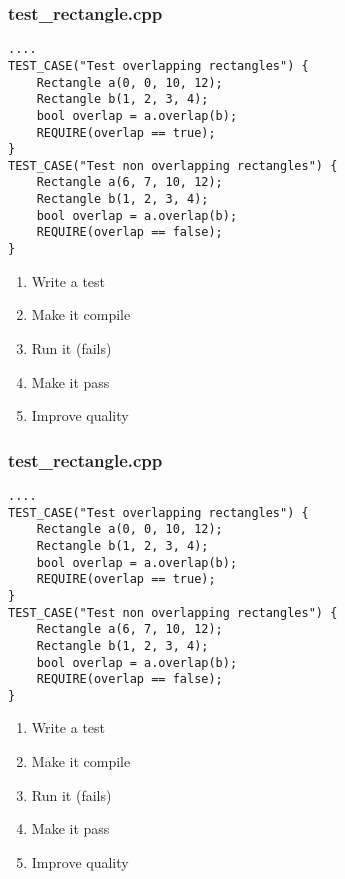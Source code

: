 \begin{frame}[fragile]
\frametitle{test\_rectangle.cpp}
\begin{minipage}[t]{0.48\linewidth}
\begin{lstlisting}
....
TEST_CASE("Test overlapping rectangles") {
    Rectangle a(0, 0, 10, 12);
    Rectangle b(1, 2, 3, 4);
    bool overlap = a.overlap(b);
    REQUIRE(overlap == true);
}
TEST_CASE("Test non overlapping rectangles") {
    Rectangle a(6, 7, 10, 12);
    Rectangle b(1, 2, 3, 4);
    bool overlap = a.overlap(b);
    REQUIRE(overlap == false);
}
\end{lstlisting}
\end{minipage}\hfill
\begin{minipage}[t]{0.28\linewidth}
  \small
  \begin{enumerate} 
    \item \textcolor{activecolor}{Write a test}
    \item \textcolor{deadcolor}{Make it compile}
    \item \textcolor{deadcolor}{Run it (fails)}
    \item \textcolor{deadcolor}{Make it pass}
    \item \textcolor{deadcolor}{Improve quality}
  \end{enumerate} 
\end{minipage}
\end{frame}


\begin{frame}[fragile]
\frametitle{test\_rectangle.cpp}
\begin{minipage}[t]{0.48\linewidth}
\begin{lstlisting}
....
TEST_CASE("Test overlapping rectangles") {
    Rectangle a(0, 0, 10, 12);
    Rectangle b(1, 2, 3, 4);
    bool overlap = a.overlap(b);
    REQUIRE(overlap == true);
}
TEST_CASE("Test non overlapping rectangles") {
    Rectangle a(6, 7, 10, 12);
    Rectangle b(1, 2, 3, 4);
    bool overlap = a.overlap(b);
    REQUIRE(overlap == false);
}
\end{lstlisting}
\end{minipage}\hfill
\begin{minipage}[t]{0.28\linewidth}
  \small
  \begin{enumerate} 
    \item \textcolor{deadcolor}{Write a test}
    \item \textcolor{activecolor}{Make it compile}
    \item \textcolor{deadcolor}{Run it (fails)}
    \item \textcolor{deadcolor}{Make it pass}
    \item \textcolor{deadcolor}{Improve quality}
  \end{enumerate} 
\end{minipage}
\end{frame}


